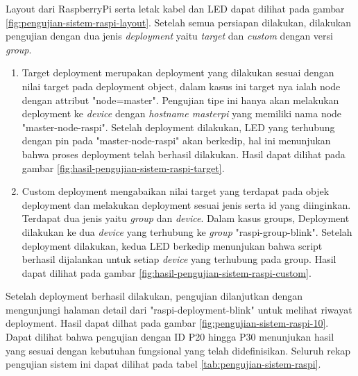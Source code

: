 Layout dari RaspberryPi serta letak kabel dan LED dapat dilihat pada gambar \ref{fig:pengujian-sistem-raspi-layout}. Setelah semua persiapan dilakukan, dilakukan pengujian dengan dua jenis \textit{deployment} yaitu \textit{target} dan \textit{custom} dengan versi \textit{group}.
\begin{enumerate}
  \item Target deployment merupakan deployment yang dilakukan sesuai dengan nilai target pada deployment object, dalam kasus ini target nya ialah node dengan attribut "node=master". Pengujian tipe ini hanya akan melakukan deployment ke \textit{device} dengan \textit{hostname masterpi} yang memiliki nama node "master-node-raspi". Setelah deployment dilakukan, LED yang terhubung dengan pin pada "master-node-raspi" akan berkedip, hal ini menunjukan bahwa proses deployment telah berhasil dilakukan. Hasil dapat dilihat pada gambar \ref{fig:hasil-pengujian-sistem-raspi-target}.
  \item Custom deployment mengabaikan nilai target yang terdapat pada objek deployment dan melakukan deployment sesuai jenis serta id yang diinginkan. Terdapat dua jenis yaitu \textit{group} dan \textit{device}. Dalam kasus groups, Deployment dilakukan ke dua \textit{device} yang terhubung ke \textit{group} "raspi-group-blink". Setelah deployment dilakukan, kedua LED berkedip menunjukan bahwa script berhasil dijalankan untuk setiap \textit{device} yang terhubung pada group. Hasil dapat dilihat pada gambar \ref{fig:hasil-pengujian-sistem-raspi-custom}.
\end{enumerate}

Setelah deployment berhasil dilakukan, pengujian dilanjutkan dengan mengunjungi halaman detail dari "raspi-deployment-blink" untuk melihat riwayat deployment. Hasil dapat dilhat pada gambar \ref{fig:pengujian-sistem-raspi-10}. Dapat dilihat bahwa pengujian dengan ID P20 hingga P30 menunjukan hasil yang sesuai dengan kebutuhan fungsional yang telah didefinisikan. Seluruh rekap pengujian sistem ini dapat dilihat pada tabel \ref{tab:pengujian-sistem-raspi}.

